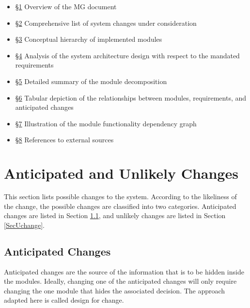 \documentclass[12pt, titlepage]{article}
\newcommand{\newSection}[1]{
  \newpage
  \section{#1}
}
\begin{document}
        \begin{itemize}
            \item[] \hyperref[SecIntro]{\S1} Overview of the MG document
            \item[] \hyperref[SecChange]{\S2} Comprehensive list of system changes under consideration
            \item[] \hyperref[SecMH]{\S3} Conceptual hierarchy of implemented modules
            \item[] \hyperref[SecConnection]{\S4} Analysis of the system architecture design with respect to the mandated requirements
            \item[] \hyperref[SecMD]{\S5} Detailed summary of the module decomposition 
            \item[] \hyperref[SecTM]{\S6} Tabular depiction of the relationships between modules, requirements, and anticipated changes
            \item[] \hyperref[SecUse]{\S7} Illustration of the module functionality dependency graph
            \item[] \hyperref[SecRef]{\S8} References to external sources
        \end{itemize}

\newSection{Anticipated and Unlikely Changes} \label{SecChange}

    This section lists possible changes to the system. According to the likeliness of the change, the possible changes are classified into two  categories. Anticipated changes are listed in Section \ref{SecAchange}, and unlikely changes are listed in Section \ref{SecUchange}.

    \subsection{Anticipated Changes} \label{SecAchange}

        Anticipated changes are the source of the information that is to be hidden inside the modules. Ideally, changing one of the anticipated changes will only require changing the one module that hides the associated decision. The approach adapted here is called design for change.
\end{document}
